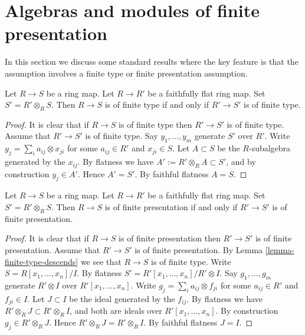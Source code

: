 \section{Algebras and modules of finite presentation}
\label{section-finite-presentation}

\noindent
In this section we discuss some standard results where the key
feature is that the assumption involves a finite type or finite
presentation assumption.

\begin{lemma}
\label{lemma-finite-type-descends}
Let $R \to S$ be a ring map.
Let $R \to R'$ be a faithfully flat ring map.
Set $S' = R'\otimes_R S$.
Then $R \to S$ is of finite type if and only if $R' \to S'$
is of finite type.
\end{lemma}

\begin{proof}
It is clear that if $R \to S$ is of finite type then $R' \to S'$
is of finite type. Assume that $R' \to S'$ is of finite type.
Say $y_1, \ldots, y_m$ generate $S'$ over $R'$.
Write $y_j = \sum_i a_{ij} \otimes x_{ji}$ for some
$a_{ij} \in R'$ and $x_{ji} \in S$. Let $A \subset S$
be the $R$-subalgebra generated by the $x_{ij}$.
By flatness we have $A' := R' \otimes_R A \subset S'$, and
by construction $y_j \in A'$. Hence $A' = S'$.
By faithful flatness $A = S$.
\end{proof}

\begin{lemma}
\label{lemma-finite-presentation-descends}
Let $R \to S$ be a ring map.
Let $R \to R'$ be a faithfully flat ring map.
Set $S' = R'\otimes_R S$.
Then $R \to S$ is of finite presentation if and only if $R' \to S'$
is of finite presentation.
\end{lemma}

\begin{proof}
It is clear that if $R \to S$ is of finite presentation then $R' \to S'$
is of finite presentation. Assume that $R' \to S'$ is of finite presentation.
By Lemma \ref{lemma-finite-type-descends} we see
that $R \to S$ is of finite type. Write $S = R[x_1, \ldots, x_n]/I$.
By flatness $S' = R'[x_1, \ldots, x_n]/R'\otimes I$.
Say $g_1, \ldots, g_m$ generate $R'\otimes I$ over $R'[x_1, \ldots, x_n]$.
Write $g_j = \sum_i a_{ij} \otimes f_{ji}$ for some
$a_{ij} \in R'$ and $f_{ji} \in I$. Let $J \subset I$
be the ideal generated by the $f_{ij}$.
By flatness we have $R' \otimes_R J \subset R'\otimes_R I$, and
both are ideals over $R'[x_1, \ldots, x_n]$.
By construction $g_j \in R' \otimes_R J$. Hence
$R' \otimes_R J = R'\otimes_R I$.
By faithful flatness $J = I$.
\end{proof}

